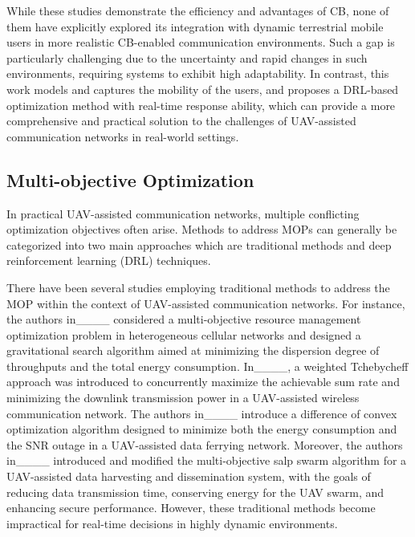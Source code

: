 \par While these studies demonstrate the efficiency and advantages of CB, none of them have explicitly explored its integration with dynamic terrestrial mobile users in more realistic CB-enabled communication environments. Such a gap is particularly challenging due to the uncertainty and rapid changes in such environments, requiring systems to exhibit high adaptability. In contrast, this work models and captures the mobility of the users, and proposes a DRL-based optimization method with real-time response ability, which can provide a more comprehensive and practical solution to the challenges of UAV-assisted communication networks in real-world settings.


\subsection{Multi-objective Optimization}
\label{Multi-objective Optimization}

\par In practical UAV-assisted communication networks, multiple conflicting optimization objectives often arise. Methods to address MOPs can generally be categorized into two main approaches which are traditional methods and deep reinforcement learning (DRL) techniques.

\par There have been several studies employing traditional methods to address the MOP within the context of UAV-assisted communication networks. For instance, the authors in____ considered a multi-objective resource management optimization problem in heterogeneous cellular networks and designed a gravitational search algorithm aimed at minimizing the dispersion degree of throughputs and the total energy consumption. In____, a weighted Tchebycheff approach was introduced to concurrently maximize the achievable sum rate and minimizing the downlink transmission power in a UAV-assisted wireless communication network. The authors in____ introduce a difference of convex optimization algorithm designed to minimize both the energy consumption and the SNR outage in a UAV-assisted data ferrying network. Moreover, the authors in____ introduced and modified the multi-objective salp swarm algorithm for a UAV-assisted data harvesting and dissemination system, with the goals of reducing data transmission time, conserving energy for the UAV swarm, and enhancing secure performance. However, these traditional methods become impractical for real-time decisions in highly dynamic environments.

